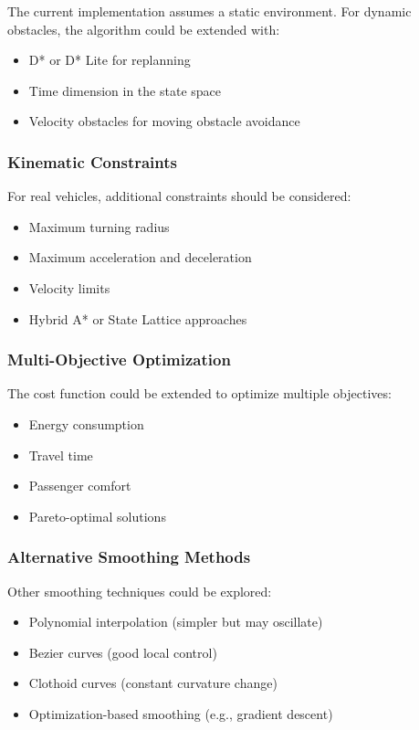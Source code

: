 \documentclass[aps,letterpaper,10pt]{revtex4}
\begin{document}
The current implementation assumes a static environment. For dynamic obstacles, the algorithm could be extended with:
\begin{itemize}
    \item D* or D* Lite for replanning
    \item Time dimension in the state space
    \item Velocity obstacles for moving obstacle avoidance
\end{itemize}

\subsubsection{Kinematic Constraints}

For real vehicles, additional constraints should be considered:
\begin{itemize}
    \item Maximum turning radius
    \item Maximum acceleration and deceleration
    \item Velocity limits
    \item Hybrid A* or State Lattice approaches
\end{itemize}

\subsubsection{Multi-Objective Optimization}

The cost function could be extended to optimize multiple objectives:
\begin{itemize}
    \item Energy consumption
    \item Travel time
    \item Passenger comfort
    \item Pareto-optimal solutions
\end{itemize}

\subsubsection{Alternative Smoothing Methods}

Other smoothing techniques could be explored:
\begin{itemize}
    \item Polynomial interpolation (simpler but may oscillate)
    \item Bezier curves (good local control)
    \item Clothoid curves (constant curvature change)
    \item Optimization-based smoothing (e.g., gradient descent)
\end{itemize}
\end{document}

